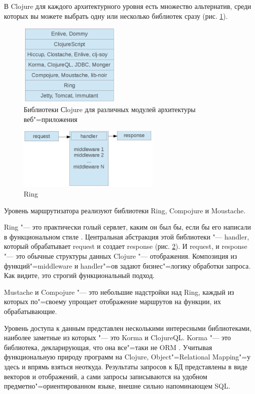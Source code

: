 \documentclass[10pt, a5paper]{article}
\begin{document}
В Clojure для каждого архитектурного уровня есть множество альтернатив, среди которых вы можете выбрать одну или несколько библиотек сразу (рис. \ref{fig:Bushenko1}).

\begin{figure} [h]
  \centering
  \includegraphics[height=4cm]{119_2013_w_figure1}
\caption{Библиотеки Сlojure для различных модулей архитектуры веб"=приложения}\label{fig:Bushenko1}
\end{figure}


\begin{figure}[h]
  \centering
  \includegraphics[height=3cm]{119_2013_w_figure2}
\caption{Ring}\label{fig:Bushenko2}
\end{figure}


Уровень маршрутизатора реализуют библиотеки Ring, \linebreak Compojure и Moustache.

Ring "--- это практически голый сервлет, каким он был бы, если бы его написали в функциональном стиле \cite{Bushenko3}. Центральная абстракция этой библиотеки "--- handler, который обрабатывает request и создает response (рис. \ref{fig:Bushenko2}). И request, и response "--- это обычные структуры данных Clojure "--- отображения. Композиция из функций"=middleware и handler"=ов задают бизнес"=логику обработки запроса. Как видите, это строгий функциональный подход.



Mustache и Compojure "--- это небольшие надстройки над Ring, каждый из которых по"=своему упрощает отображение маршрутов на функции, их обрабатывающие.

Уровень доступа к данным представлен несколькими интересными библиотеками, наиболее заметные из которых "--- это Korma и ClojureQL.
Korma "--- это библиотека, декларирующая, что она все"=таки не ORM \cite{Bushenko4}. Учитывая функциональную природу программ на Clojure, Object"=Relational Mapping"=у здесь и впрямь взяться неоткуда. Результаты запросов к БД представлены в виде векторов и отображений, а сами запросы записываются на удобном предметно"=ориентированном языке, внешне сильно напоминающем SQL.
\end{document}
